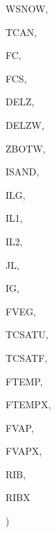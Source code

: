 {\begin{DoxyParamCaption}
\item[{real, dimension (ilg)}]{W\+S\+N\+O\+W, }
\item[{real, dimension  (ilg)}]{T\+C\+A\+N, }
\item[{real, dimension    (ilg)}]{F\+C, }
\item[{real, dimension   (ilg)}]{F\+C\+S, }
\item[{real, dimension(ig)}]{D\+E\+L\+Z, }
\item[{real, dimension(ilg,ig)}]{D\+E\+L\+Z\+W, }
\item[{real, dimension(ilg,ig)}]{Z\+B\+O\+T\+W, }
\item[{integer, dimension (ilg,ig)}]{I\+S\+A\+N\+D, }
\item[{integer}]{I\+L\+G, }
\item[{integer}]{I\+L1, }
\item[{integer}]{I\+L2, }
\item[{integer}]{J\+L, }
\item[{integer}]{I\+G, }
\item[{real, dimension  (ilg)}]{F\+V\+E\+G, }
\item[{real, dimension(ilg)}]{T\+C\+S\+A\+T\+U, }
\item[{real, dimension(ilg)}]{T\+C\+S\+A\+T\+F, }
\item[{real, dimension (ilg)}]{F\+T\+E\+M\+P, }
\item[{real, dimension(ilg)}]{F\+T\+E\+M\+P\+X, }
\item[{real, dimension  (ilg)}]{F\+V\+A\+P, }
\item[{real, dimension (ilg)}]{F\+V\+A\+P\+X, }
\item[{real, dimension   (ilg)}]{R\+I\+B, }
\item[{real, dimension  (ilg)}]{R\+I\+B\+X}
\end{DoxyParamCaption}
)}\label{TPREP_8f_a7e4916d23e9c1a0300f168e58bbf7ae4}

